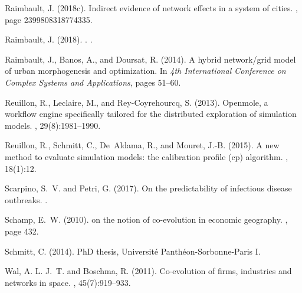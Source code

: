 \documentclass[graybox]{svmult}
\begin{document}
\begin{thebibliography}{}
Raimbault, J. (2018c).
\newblock Indirect evidence of network effects in a system of cities.
,
  page 2399808318774335.

{Raimbault}, J. (2018).
.
.

Raimbault, J., Banos, A., and Doursat, R. (2014).
\newblock A hybrid network/grid model of urban morphogenesis and optimization.
\newblock In {\em 4th International Conference on Complex Systems and
  Applications}, pages 51--60.

Reuillon, R., Leclaire, M., and Rey-Coyrehourcq, S. (2013).
\newblock Openmole, a workflow engine specifically tailored for the distributed
  exploration of simulation models.
, 29(8):1981--1990.

Reuillon, R., Schmitt, C., De~Aldama, R., and Mouret, J.-B. (2015).
\newblock A new method to evaluate simulation models: the calibration profile
  (cp) algorithm.
,
  18(1):12.

Scarpino, S.~V. and Petri, G. (2017).
\newblock On the predictability of infectious disease outbreaks.
.

Schamp, E.~W. (2010).
 on the notion of co-evolution in economic geography.
, page 432.

Schmitt, C. (2014).
\newblock PhD thesis, Universit{\'e} Panth{\'e}on-Sorbonne-Paris I.

Wal, A. L. J.~T. and Boschma, R. (2011).
\newblock Co-evolution of firms, industries and networks in space.
, 45(7):919--933.

\end{thebibliography}
\end{document}
